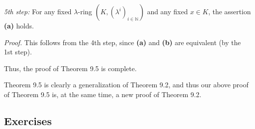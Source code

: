 \documentclass[numbers=enddot,12pt,final,onecolumn,notitlepage]{scrartcl}%
\begin{document}
\textit{5th step:} For any fixed $\lambda$-ring $\left(  K,\left(  \lambda
^{i}\right)  _{i\in\mathbb{N}}\right)  $ and any fixed $x\in K$, the assertion
\textbf{(a)} holds.

\textit{Proof.} This follows from the 4th step, since \textbf{(a)} and
\textbf{(b)} are equivalent (by the 1st step).

Thus, the proof of Theorem 9.5 is complete.

Theorem 9.5 is clearly a generalization of Theorem 9.2, and thus our above
proof of Theorem 9.5 is, at the same time, a new proof of Theorem 9.2.

\subsection{Exercises}
\end{document}
